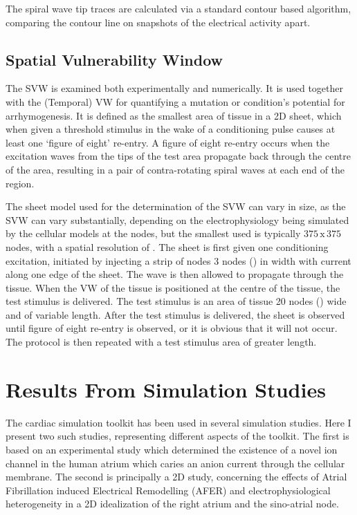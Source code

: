 The spiral wave tip traces are calculated via a standard contour based
algorithm, comparing the  contour line on snapshots of the electrical
activity  apart.

\subsection{Spatial Vulnerability Window}

The SVW is examined both experimentally and numerically.  It is used together
with the (Temporal) VW for quantifying a mutation or condition's potential for
arrhymogenesis.  It is defined as the smallest area of tissue in a 2D sheet,
which when given a threshold stimulus in the wake of a conditioning pulse causes
at least one `figure of eight' re-entry.  A figure of eight re-entry occurs when
the excitation waves from the tips of the test area propagate back through the
centre of the area, resulting in a pair of contra-rotating spiral waves at each
end of the region.

The sheet model used for the determination of the SVW can vary in size, as the
SVW can vary substantially, depending on the electrophysiology being simulated
by the cellular models at the nodes, but the smallest used is typically
$375\,\text{x}\,375$ nodes, with a spatial resolution of .  The sheet is first given one
conditioning excitation, initiated by injecting a strip of nodes 3 nodes
() in width with current along one edge of the sheet.  The wave is then
allowed to propagate through the tissue.  When the VW of the tissue is
positioned at the centre of the tissue, the test stimulus is delivered.  The
test stimulus is an area of tissue 20 nodes () wide and of variable length.
After the test stimulus is delivered, the sheet is observed until figure of
eight re-entry is observed, or it is obvious that it will not occur.  The
protocol is then repeated with a test stimulus area of greater length.


\section{Results From Simulation Studies}

The cardiac simulation toolkit has been used in several simulation studies.
Here I present two such studies, representing different aspects of the toolkit.
The first is based on an experimental study which determined the existence of a
novel ion channel in the human atrium which caries an anion current through the
cellular membrane.  The second is principally a 2D study, concerning the effects
of Atrial Fibrillation induced Electrical Remodelling (AFER) and
electrophysiological heterogeneity in a 2D idealization of the right atrium and
the sino-atrial node.

